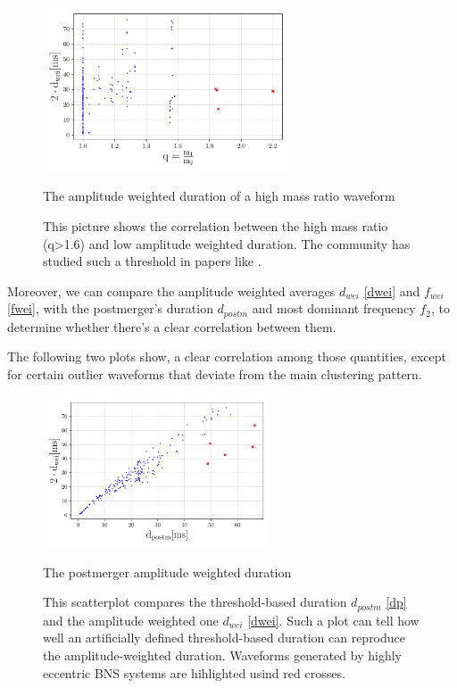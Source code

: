 \begin{figure}[hbt!]
\begin{center}
\includegraphics[width=0.65\textwidth, angle=0]{images/Data_analysis/results/Mr.pdf}
\captionsetup{width=0.8\textwidth}
\caption{The amplitude weighted duration of a high mass ratio waveform}
\caption*{This picture shows the correlation between the high mass ratio (q>1.6) and low amplitude weighted duration. The community has studied such a threshold in papers like \cite{Kolsch:2021lub}.}
\label{High mass ratio}
\end{center}
\end{figure}
\FloatBarrier


Moreover, we can compare the amplitude weighted averages $d_{wei}$ \ref{dwei} and $f_{wei}$ \ref{fwei}, with the postmerger's duration $d_{postm}$ and most dominant frequency $f_2$, to determine whether there's a clear correlation between them.

The following two plots show, a clear correlation among those quantities, except for certain outlier waveforms that deviate from the main clustering pattern. 

\begin{figure}[hbt!]
\begin{center}
\includegraphics[width=0.6\textwidth, angle=0]{images/Data_analysis/results/res1.pdf}
\captionsetup{width=0.8\textwidth}
\caption{The postmerger amplitude weighted duration}
\caption*{This scatterplot compares the threshold-based duration $d_{postm}$ \ref{dp} and the amplitude weighted one $d_{wei}$ \ref{dwei}. Such a plot can tell how well an artificially defined threshold-based duration can reproduce the amplitude-weighted duration. Waveforms generated by highly eccentric BNS systems are hihlighted usind red crosses.}
\label{duration measure}
\end{center}
\end{figure}

